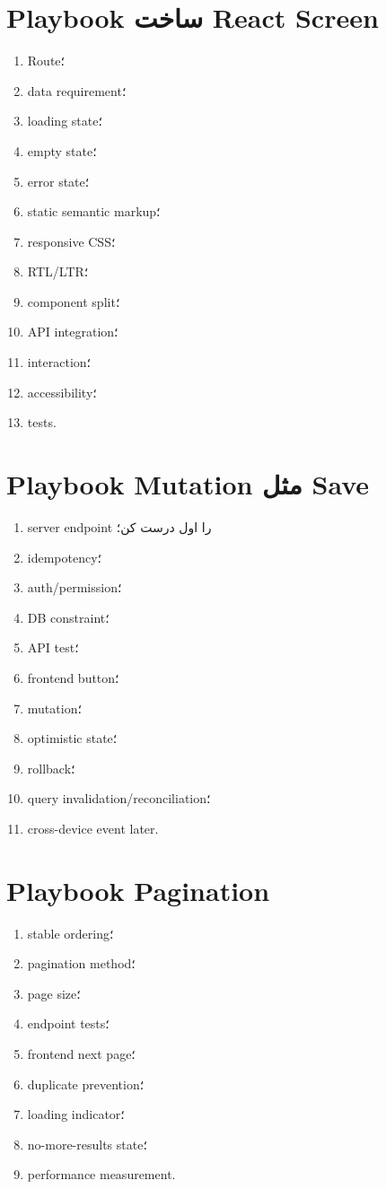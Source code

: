 \section{Playbook ساخت React Screen}

\begin{enumerate}
  \item Route؛
  \item data requirement؛
  \item loading state؛
  \item empty state؛
  \item error state؛
  \item static semantic markup؛
  \item responsive CSS؛
  \item RTL/LTR؛
  \item component split؛
  \item API integration؛
  \item interaction؛
  \item accessibility؛
  \item tests.
\end{enumerate}

\section{Playbook Mutation مثل Save}

\begin{enumerate}
  \item server endpoint را اول درست کن؛
  \item idempotency؛
  \item auth/permission؛
  \item DB constraint؛
  \item API test؛
  \item frontend button؛
  \item mutation؛
  \item optimistic state؛
  \item rollback؛
  \item query invalidation/reconciliation؛
  \item cross-device event later.
\end{enumerate}

\section{Playbook Pagination}

\begin{enumerate}
  \item stable ordering؛
  \item pagination method؛
  \item page size؛
  \item endpoint tests؛
  \item frontend next page؛
  \item duplicate prevention؛
  \item loading indicator؛
  \item no-more-results state؛
  \item performance measurement.
\end{enumerate}

